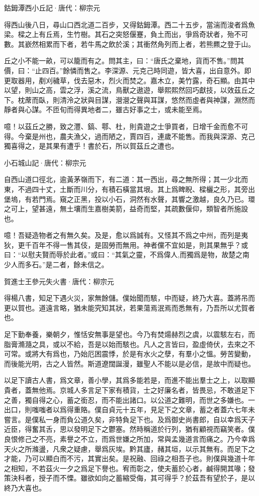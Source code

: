 \documentclass[12pt,a4paper]{ctexbook}
\begin{document}
鈷鉧潭西小丘記·唐代：柳宗元 \par
得西山後八日，尋山口西北道二百步，又得鈷鉧潭。西二十五步，當湍而浚者爲魚梁。樑之上有丘焉，生竹樹。其石之突怒偃蹇，負土而出，爭爲奇狀者，殆不可數。其嶔然相累而下者，若牛馬之飲於溪；其衝然角列而上者，若熊羆之登于山。\par
丘之小不能一畝，可以籠而有之。問其主，曰：“唐氏之棄地，貨而不售。”問其價，曰：“止四百。”餘憐而售之。李深源、元克己時同遊，皆大喜，出自意外。即更取器用，剷刈穢草，伐去惡木，烈火而焚之。嘉木立，美竹露，奇石顯。由其中以望，則山之高，雲之浮，溪之流，鳥獸之遨遊，舉熙熙然回巧獻技，以效茲丘之下。枕蓆而臥，則清泠之狀與目謀，瀯瀯之聲與耳謀，悠然而虛者與神謀，淵然而靜者與心謀。不匝旬而得異地者二，雖古好事之士，或未能至焉。\par
噫！以茲丘之勝，致之灃、鎬、鄠、杜，則貴遊之士爭買者，日增千金而愈不可得。今棄是州也，農夫漁父，過而陋之，賈四百，連歲不能售。而我與深源、克己獨喜得之，是其果有遭乎！書於石，所以賀茲丘之遭也。\par
小石城山記·唐代：柳宗元 \par
自西山道口徑北，逾黃茅嶺而下，有二道：其一西出，尋之無所得；其一少北而東，不過四十丈，土斷而川分，有積石橫當其垠。其上爲睥睨、樑欐之形，其旁出堡塢，有若門焉。窺之正黑，投以小石，洞然有水聲，其響之激越，良久乃已。環之可上，望甚遠，無土壤而生嘉樹美箭，益奇而堅，其疏數偃仰，類智者所施設也。\par
噫！吾疑造物者之有無久矣。及是，愈以爲誠有。又怪其不爲之中州，而列是夷狄，更千百年不得一售其伎，是固勞而無用。神者儻不宜如是，則其果無乎？或曰：“以慰夫賢而辱於此者。”或曰：“其氣之靈，不爲偉人,而獨爲是物，故楚之南少人而多石。”是二者，餘未信之。\par
賀進士王參元失火書·唐代：柳宗元 \par
得楊八書，知足下遇火災，家無餘儲。僕始聞而駭，中而疑，終乃大喜。蓋將吊而更以賀也。道遠言略，猶未能究知其狀，若果蕩焉泯焉而悉無有，乃吾所以尤賀者也。\par
足下勤奉養，樂朝夕，惟恬安無事是望也。今乃有焚煬赫烈之虞，以震駭左右，而脂膏滫瀡之具，或以不給，吾是以始而駭也。凡人之言皆曰，盈虛倚伏，去來之不可常。或將大有爲也，乃始厄困震悸，於是有水火之孽，有羣小之慍。勞苦變動，而後能光明，古之人皆然。斯道遼闊誕漫，雖聖人不能以是必信，是故中而疑也。\par
以足下讀古人書，爲文章，善小學，其爲多能若是，而進不能出羣士之上，以取顯貴者，蓋無他焉。京城人多言足下家有積貨，士之好廉名者，皆畏忌，不敢道足下之善，獨自得之心，蓄之銜忍，而不能出諸口。以公道之難明，而世之多嫌也。一出口，則嗤嗤者以爲得重賂。僕自貞元十五年，見足下之文章，蓄之者蓋六七年未嘗言。是僕私一身而負公道久矣，非特負足下也。及爲御史尚書郎，自以幸爲天子近臣，得奮其舌，思以發明足下之鬱塞。然時稱道於行列，猶有顧視而竊笑者。僕良恨修己之不亮，素譽之不立，而爲世嫌之所加，常與孟幾道言而痛之。乃今幸爲天火之所滌盪，凡衆之疑慮，舉爲灰埃。黔其廬，赭其垣，以示其無有。而足下之才能，乃可以顯白而不污，其實出矣。是祝融、回祿之相吾子也。則僕與幾道十年之相知，不若茲火一夕之爲足下譽也。宥而彰之，使夫蓄於心者，鹹得開其喙；發策決科者，授子而不慄。雖欲如向之蓄縮受侮，其可得乎？於茲吾有望於子，是以終乃大喜也。\par
\end{document}
